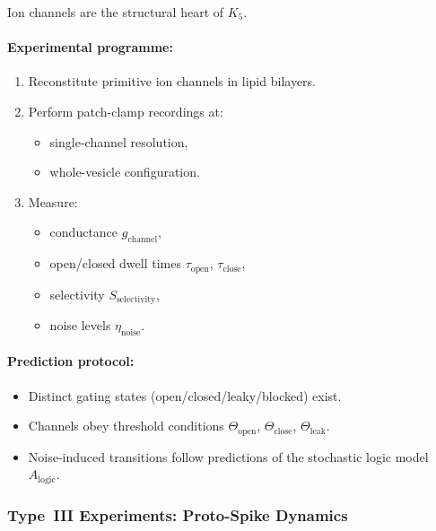 Ion channels are the structural heart of $K_5$.

\paragraph{Experimental programme:}

\begin{enumerate}
    \item Reconstitute primitive ion channels in lipid bilayers.
    \item Perform patch-clamp recordings at:
          \begin{itemize}
              \item single-channel resolution,
              \item whole-vesicle configuration.
          \end{itemize}
    \item Measure:
          \begin{itemize}
              \item conductance $g_{\mathrm{channel}}$,
              \item open/closed dwell times $\tau_{\mathrm{open}}$, $\tau_{\mathrm{close}}$,
              \item selectivity $S_{\mathrm{selectivity}}$,
              \item noise levels $\eta_{\mathrm{noise}}$.
          \end{itemize}
\end{enumerate}

\paragraph{Prediction protocol:}

\begin{itemize}
    \item Distinct gating states (open/closed/leaky/blocked) exist.
    \item Channels obey threshold conditions
          $\Theta_{\mathrm{open}}$, $\Theta_{\mathrm{close}}$, $\Theta_{\mathrm{leak}}$.
    \item Noise-induced transitions follow predictions of the
          stochastic logic model $A_{\mathrm{logic}}$.
\end{itemize}



\subsubsection{Type~III Experiments: Proto-Spike Dynamics}

